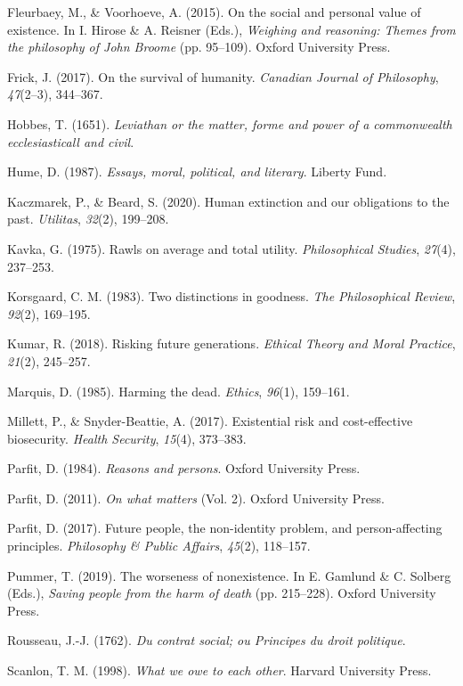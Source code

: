 \documentclass[man,11pt,a4paper]{apa7}
\begin{document}
\begin{list}{}{\setlength{\leftmargin}{0.5in}\setlength{\itemindent}{-0.5in}\setlength{\itemsep}{0pt}\setlength{\parsep}{0pt}}
\item Fleurbaey, M., \& Voorhoeve, A. (2015). On the social and personal value of existence. In I. Hirose \& A. Reisner (Eds.), \textit{Weighing and reasoning: Themes from the philosophy of John Broome} (pp. 95--109). Oxford University Press.
\item Frick, J. (2017). On the survival of humanity. \textit{Canadian Journal of Philosophy}, \textit{47}(2--3), 344--367.
\item Hobbes, T. (1651). \textit{Leviathan or the matter, forme and power of a commonwealth ecclesiasticall and civil}.
\item Hume, D. (1987). \textit{Essays, moral, political, and literary}. Liberty Fund.
\item Kaczmarek, P., \& Beard, S. (2020). Human extinction and our obligations to the past. \textit{Utilitas}, \textit{32}(2), 199--208.
\item Kavka, G. (1975). Rawls on average and total utility. \textit{Philosophical Studies}, \textit{27}(4), 237--253.
\item Korsgaard, C. M. (1983). Two distinctions in goodness. \textit{The Philosophical Review}, \textit{92}(2), 169--195.
\item Kumar, R. (2018). Risking future generations. \textit{Ethical Theory and Moral Practice}, \textit{21}(2), 245--257.
\item Marquis, D. (1985). Harming the dead. \textit{Ethics}, \textit{96}(1), 159--161.
\item Millett, P., \& Snyder-Beattie, A. (2017). Existential risk and cost-effective biosecurity. \textit{Health Security}, \textit{15}(4), 373--383.
\item Parfit, D. (1984). \textit{Reasons and persons}. Oxford University Press.
\item Parfit, D. (2011). \textit{On what matters} (Vol. 2). Oxford University Press.
\item Parfit, D. (2017). Future people, the non-identity problem, and person-affecting principles. \textit{Philosophy \& Public Affairs}, \textit{45}(2), 118--157.
\item Pummer, T. (2019). The worseness of nonexistence. In E. Gamlund \& C. Solberg (Eds.), \textit{Saving people from the harm of death} (pp. 215--228). Oxford University Press.
\item Rousseau, J.-J. (1762). \textit{Du contrat social; ou Principes du droit politique}.
\item Scanlon, T. M. (1998). \textit{What we owe to each other}. Harvard University Press.

\end{list}
\end{document}
